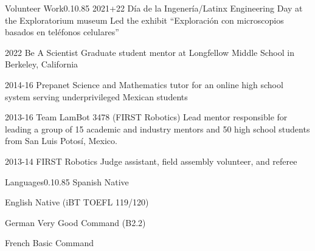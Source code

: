 \documentclass{federico_cv}
\begin{document}
\begin{tblSection}{Volunteer Work}{0.1}{0.85}
\job
{2021+22}
{Día de la Ingenería/Latinx Engineering Day at the Exploratorium museum}
{Led the exhibit ``Exploración con microscopios basados en teléfonos celulares''}

\job
{2022}
{Be A Scientist}
{Graduate student mentor at Longfellow Middle School in Berkeley, California}

\job
{2014-16}
{Prepanet}
{Science and Mathematics tutor for an online high school system serving underprivileged Mexican students}

\job
{2013-16}
{Team LamBot 3478 (FIRST Robotics)}
{Lead mentor responsible for leading a group of 15 academic and industry mentors and 50 high school students from San Luis Potosí, Mexico.}

\job
{2013-14}
{FIRST Robotics}
{Judge assistant, field assembly volunteer, and referee}

\end{tblSection}


\begin{tblSection}{Languages}{0.1}{0.85}
\leftrightsingletight
{Spanish}
{Native}

\leftrightsingletight
{English}
{Native (iBT TOEFL 119/120)}

\leftrightsingletight
{German}
{Very Good Command (B2.2)}

\leftrightsingletight
{French}
{Basic Command}

\end{tblSection}
\end{document}
